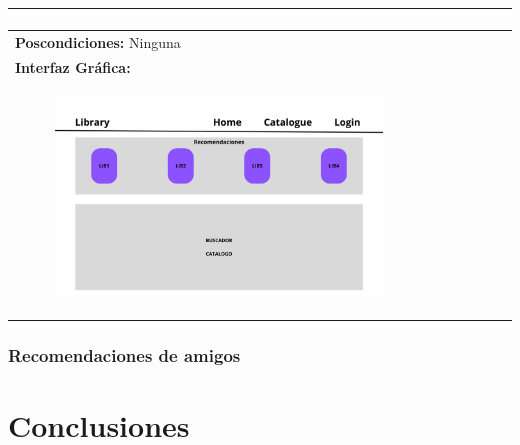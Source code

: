 \documentclass{report}
\begin{document}
\begin{center}
\begin{longtable}{|p{\linewidth}|}
\begin{enumerate}
                    \end{enumerate}\\
                    \hline
                    \textbf{Poscondiciones:} Ninguna\\
                    \hline
                    \textbf{Interfaz Gráfica:}\\
                    \begin{figure}[H]
                        \centering
                        \includegraphics[width=0.8\textwidth]{./img/grafico/recom_lib.png}
                    \end{figure}\\
                    \hline
                \end{longtable}
            \end{center}
        \clearpage
        \subsection{Recomendaciones de amigos}
    \chapter{Conclusiones} 
\end{document}
